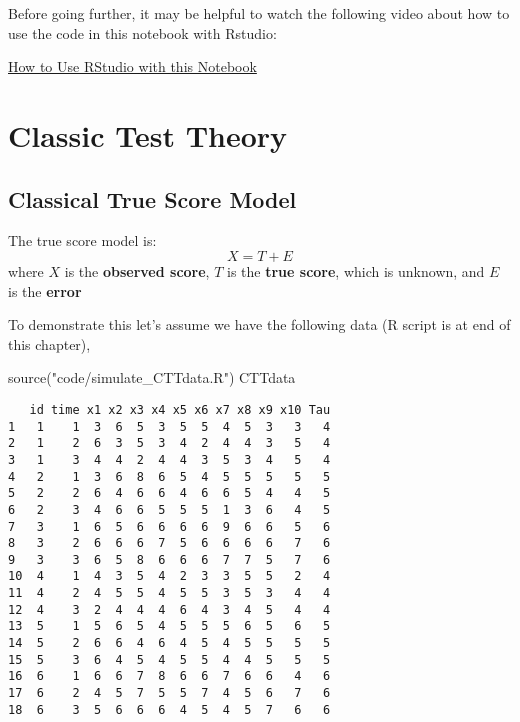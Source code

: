 \documentclass[
]{book}
\newenvironment{Shaded}{\begin{snugshade}}{\end{snugshade}}
\newcommand{\FunctionTok}[1]{\textcolor[rgb]{0.00,0.00,0.00}{#1}}
\newcommand{\NormalTok}[1]{#1}
\newcommand{\StringTok}[1]{\textcolor[rgb]{0.31,0.60,0.02}{#1}}
\begin{document}
Before going further, it may be helpful to watch the following video about how to use the code in this notebook with Rstudio:

\href{https://auburn.hosted.panopto.com/Panopto/Pages/Viewer.aspx?id=13acb849-902a-45c7-bc4e-ad870153fcae}{How to Use RStudio with this Notebook}

\hypertarget{CCT}{%
\chapter{Classic Test Theory}\label{CCT}}

\hypertarget{classical-true-score-model}{%
\section{Classical True Score Model}\label{classical-true-score-model}}

The true score model is:
\[
X = T + E
\]
where \(X\) is the \textbf{observed score}, \(T\) is the \textbf{true score}, which is unknown, and \(E\) is the \textbf{error}

To demonstrate this let's assume we have the following data (R script is at end of this chapter),

\begin{Shaded}
\begin{Highlighting}[]
\FunctionTok{source}\NormalTok{(}\StringTok{"code/simulate\_CTTdata.R"}\NormalTok{)}
\NormalTok{CTTdata}
\end{Highlighting}
\end{Shaded}

\begin{verbatim}
   id time x1 x2 x3 x4 x5 x6 x7 x8 x9 x10 Tau
1   1    1  3  6  5  3  5  5  4  5  3   3   4
2   1    2  6  3  5  3  4  2  4  4  3   5   4
3   1    3  4  4  2  4  4  3  5  3  4   5   4
4   2    1  3  6  8  6  5  4  5  5  5   5   5
5   2    2  6  4  6  6  4  6  6  5  4   4   5
6   2    3  4  6  6  5  5  5  1  3  6   4   5
7   3    1  6  5  6  6  6  6  9  6  6   5   6
8   3    2  6  6  6  7  5  6  6  6  6   7   6
9   3    3  6  5  8  6  6  6  7  7  5   7   6
10  4    1  4  3  5  4  2  3  3  5  5   2   4
11  4    2  4  5  5  4  5  5  3  5  3   4   4
12  4    3  2  4  4  4  6  4  3  4  5   4   4
13  5    1  5  6  5  4  5  5  5  6  5   6   5
14  5    2  6  6  4  6  4  5  4  5  5   5   5
15  5    3  6  4  5  4  5  5  4  4  5   5   5
16  6    1  6  6  7  8  6  6  7  6  6   4   6
17  6    2  4  5  7  5  5  7  4  5  6   7   6
18  6    3  5  6  6  6  4  5  4  5  7   6   6
\end{verbatim}
\end{document}
